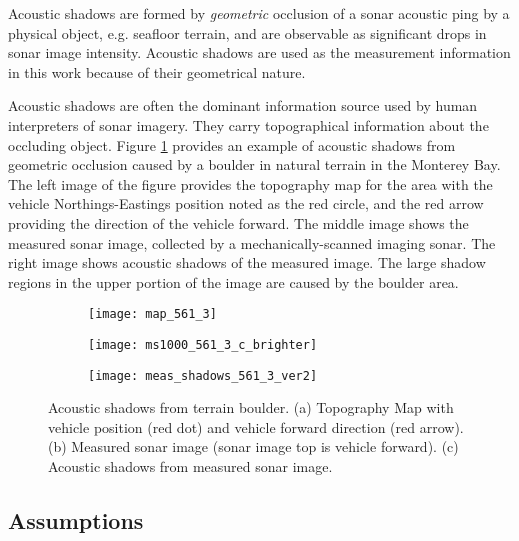 Acoustic shadows are formed by \emph{geometric} occlusion of a sonar acoustic ping by a physical object, e.g. seafloor terrain, and are observable as significant drops in sonar image intensity.
Acoustic shadows are used as the measurement information in this work because of their geometrical nature.

Acoustic shadows are often the dominant information source used by human interpreters of sonar imagery.
They carry topographical information about the occluding object.
Figure \ref{fig:shadows_561_3} provides an example of acoustic shadows from geometric occlusion caused by a boulder in natural terrain in the Monterey Bay.  
The left image of the figure provides the topography map for the area with the vehicle Northings-Eastings position noted as the red circle, and the red arrow providing the direction of the vehicle forward.
The middle image shows the measured sonar image, collected by a mechanically-scanned imaging sonar.
The right image shows acoustic shadows of the measured image.
The large shadow regions in the upper portion of the image are caused by the boulder area.

\begin{figure}[!h]
	\centering
	\begin{subfigure}[b]{0.38\textwidth}
                \texttt{[image: map\_561\_3]}
                \caption{}
  	\end{subfigure}
  	\centering
	\begin{subfigure}[b]{0.3\textwidth}
                \texttt{[image: ms1000\_561\_3\_c\_brighter]}
                \caption{}
  	\end{subfigure}
  	\centering
	\begin{subfigure}[b]{0.3\textwidth}
                \texttt{[image: meas\_shadows\_561\_3\_ver2]}
                \caption{}
  	\end{subfigure}
	\caption{Acoustic shadows from terrain boulder.  (a) Topography Map with vehicle position (red dot) and vehicle forward direction (red arrow).  (b) Measured sonar image (sonar image top is vehicle forward). (c) Acoustic shadows from measured sonar image. }	
	\label{fig:shadows_561_3}
\end{figure}

\subsection{Assumptions}
\label{sonar.Shadows.Assumptions}

